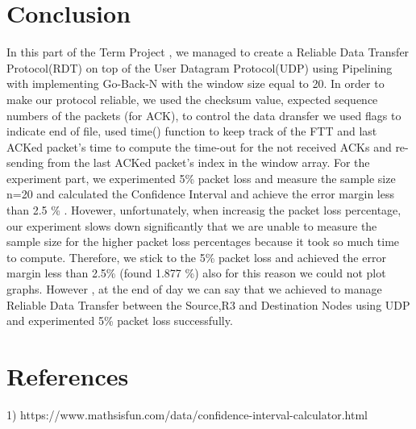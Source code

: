 \documentclass[conference]{IEEEtran}
\begin{document}
\section{Conclusion}
In this part of the Term Project , we managed to create a Reliable Data Transfer Protocol(RDT) on top of the User Datagram Protocol(UDP) using Pipelining with implementing Go-Back-N with the window size equal to 20. In order to make our protocol reliable, we used the checksum value, expected sequence numbers of the packets (for ACK), to control the data dransfer we used flags to indicate end of file, used time() function to keep track of the FTT and  last ACKed packet's time to compute the time-out for the not received ACKs and re-sending from the last ACKed packet's index in the window array. For the experiment part, we experimented 5\% packet loss and measure the sample size n=20 and calculated the Confidence Interval and achieve the error margin less than 2.5 \% . Hovewer, unfortunately, when increasig the packet loss percentage, our experiment slows down significantly that we are unable to measure the sample size for the higher packet loss percentages because it took so much time to compute. Therefore, we stick to the 5\% packet loss and achieved the error margin less than 2.5\% (found 1.877 \%) also for this reason we could not plot graphs. However , at the end of day we can say that we achieved to manage Reliable Data Transfer between the Source,R3 and Destination Nodes using UDP and experimented 5\% packet loss successfully. 

\section{References}
1) https://www.mathsisfun.com/data/confidence-interval-calculator.html
\end{document}

